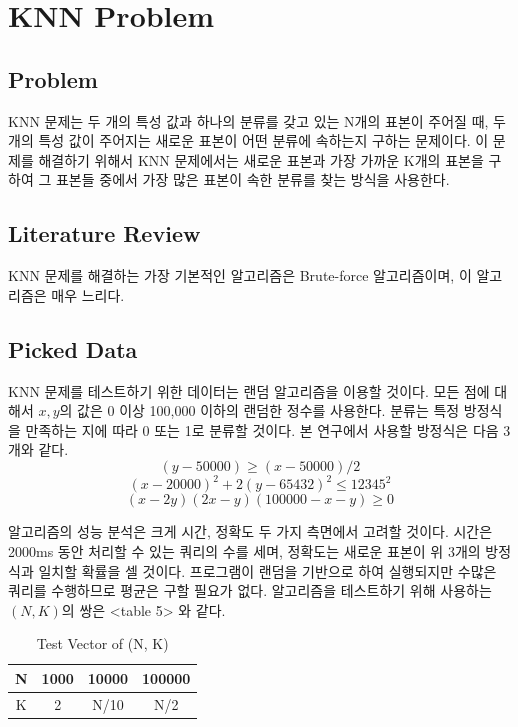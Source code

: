 \documentclass{sig-alternate-05-2015}
\begin{document}
\section{KNN Problem}
\begin{CJK}{UTF8}{mj}
\subsection{Problem}
KNN 문제는 두 개의 특성 값과 하나의 분류를 갖고 있는 N개의 표본이 주어질 때, 두 개의 특성 값이 주어지는 새로운 표본이 어떤 분류에 속하는지 구하는 문제이다. 이 문제를 해결하기 위해서 KNN 문제에서는 새로운 표본과 가장 가까운 K개의 표본을 구하여 그 표본들 중에서 가장 많은 표본이 속한 분류를 찾는 방식을 사용한다.
\subsection{Literature Review}
KNN 문제를 해결하는 가장 기본적인 알고리즘은 Brute-force 알고리즘이며, 이 알고리즘은 매우 느리다.
\subsection{Picked Data}
KNN 문제를 테스트하기 위한 데이터는 랜덤 알고리즘을 이용할 것이다. 모든 점에 대해서 $x, y$의 값은 0 이상 100,000 이하의 랜덤한 정수를 사용한다. 분류는 특정 방정식을 만족하는 지에 따라 0 또는 1로 분류할 것이다. 본 연구에서 사용할 방정식은 다음 3개와 같다.
\begin{equation} (y-50000) \geq (x-50000)/2 \end{equation}
\begin{equation} (x-20000)^2 + 2(y-65432)^2 \leq 12345^2 \end{equation}
\begin{equation} (x-2y)(2x-y)(100000-x-y) \geq 0 \end{equation}

알고리즘의 성능 분석은 크게 시간, 정확도 두 가지 측면에서 고려할 것이다. 시간은 2000ms 동안 처리할 수 있는 쿼리의 수를 세며, 정확도는 새로운 표본이 위 3개의 방정식과 일치할 확률을 셀 것이다. 프로그램이 랜덤을 기반으로 하여 실행되지만 수많은 쿼리를 수행하므로 평균은 구할 필요가 없다.
알고리즘을 테스트하기 위해 사용하는 $(N, K)$의 쌍은 <table 5> 와 같다.
\begin{table}
\centering
\caption{Test Vector of (N, K)}
\begin{tabular}{|c|c|c|c|} \hline
N & 1000 & 10000 & 100000 \\ \hline
K & 2 & N/10 & N/2 \\
\hline\end{tabular}
\end{table}


\end{CJK}
\end{document}
